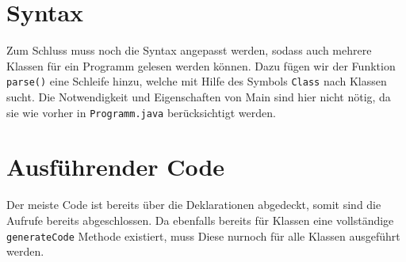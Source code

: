 \section{Syntax}
Zum Schluss muss noch die Syntax angepasst werden, sodass auch mehrere Klassen für ein Programm gelesen werden können.
Dazu fügen wir der Funktion \verb|parse()| eine Schleife hinzu, welche mit Hilfe des Symbols \verb|Class| nach Klassen sucht.
Die Notwendigkeit und Eigenschaften von Main sind hier nicht nötig, da sie wie vorher in \verb|Programm.java| berücksichtigt werden.


\section{Ausführender Code}
Der meiste Code ist bereits über die Deklarationen abgedeckt, somit sind die Aufrufe bereits abgeschlossen.
Da ebenfalls bereits für Klassen eine vollständige \verb|generateCode| Methode existiert, muss Diese nurnoch für alle Klassen ausgeführt werden.

